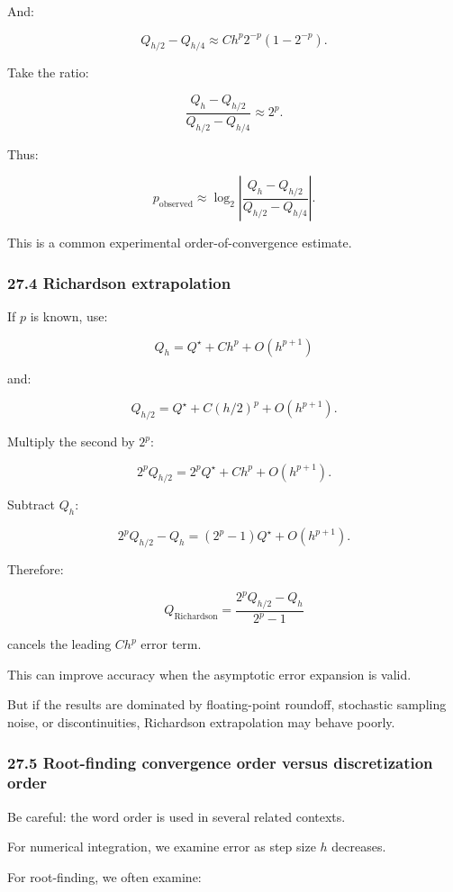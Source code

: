 And:

\[ Q_{h/2}-Q_{h/4} \approx Ch^p2^{-p}(1-2^{-p}). \]

Take the ratio:

\[ \frac{Q_h-Q_{h/2}} {Q_{h/2}-Q_{h/4}} \approx 2^p. \]

Thus:

\[ \boxed{ p_{\mathrm{observed}} \approx \log_2\left| \frac{Q_h-Q_{h/2}} {Q_{h/2}-Q_{h/4}} \right| }. \]

This is a common experimental order-of-convergence estimate.

\subsubsection{27.4 Richardson extrapolation}\label{richardson-extrapolation}

If \(p\) is known, use:

\[ Q_h=Q^\star+Ch^p+O(h^{p+1}) \]

and:

\[ Q_{h/2}=Q^\star+C(h/2)^p+O(h^{p+1}). \]

Multiply the second by \(2^p\):

\[ 2^pQ_{h/2} = 2^pQ^\star+Ch^p+O(h^{p+1}). \]

Subtract \(Q_h\):

\[ 2^pQ_{h/2}-Q_h = (2^p-1)Q^\star+O(h^{p+1}). \]

Therefore:

\[ \boxed{ Q_{\mathrm{Richardson}} = \frac{2^pQ_{h/2}-Q_h}{2^p-1} } \]

cancels the leading \(Ch^p\) error term.

This can improve accuracy when the asymptotic error expansion is valid.

But if the results are dominated by floating-point roundoff, stochastic sampling noise, or discontinuities, Richardson extrapolation may behave poorly.

\subsubsection{27.5 Root-finding convergence order versus discretization order}\label{root-finding-convergence-order-versus-discretization-order}

Be careful: the word order is used in several related contexts.

For numerical integration, we examine error as step size \(h\) decreases.

For root-finding, we often examine:

